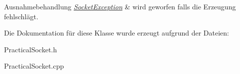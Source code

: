 \begin{DoxyExceptions}{Ausnahmebehandlung}
{\em \hyperlink{classSocketException}{Socket\-Exception}} & wird geworfen falls die Erzeugung fehlschlägt. \\
\hline
\end{DoxyExceptions}


Die Dokumentation für diese Klasse wurde erzeugt aufgrund der Dateien\-:\begin{DoxyCompactItemize}
\item 
Practical\-Socket.\-h\item 
Practical\-Socket.\-cpp\end{DoxyCompactItemize}
